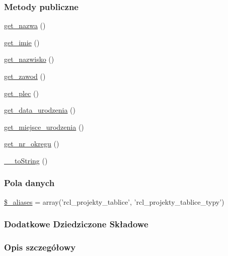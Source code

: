 \subsubsection*{Metody publiczne}
\begin{DoxyCompactItemize}
\item 
\hyperlink{classep___r_c_l___projekt___etap_ac0818f0049d7b84f08f77128f54cee36}{get\-\_\-nazwa} ()
\item 
\hyperlink{classep___r_c_l___projekt___etap_ac4b0c85dc2a130038f2d118dbd0c3d77}{get\-\_\-imie} ()
\item 
\hyperlink{classep___r_c_l___projekt___etap_abdd1d7ff92508da7f748ba1feec97af0}{get\-\_\-nazwisko} ()
\item 
\hyperlink{classep___r_c_l___projekt___etap_af80ca8310b60004454dd02a387deaa2c}{get\-\_\-zawod} ()
\item 
\hyperlink{classep___r_c_l___projekt___etap_ac7f9af5c3fa024e4c26a7b6bd4ce4bb4}{get\-\_\-plec} ()
\item 
\hyperlink{classep___r_c_l___projekt___etap_a880b240cd2d8c336fd1709bf0cb1ae2c}{get\-\_\-data\-\_\-urodzenia} ()
\item 
\hyperlink{classep___r_c_l___projekt___etap_ac57c08ec5e394a19c5bd9280c8376182}{get\-\_\-miejsce\-\_\-urodzenia} ()
\item 
\hyperlink{classep___r_c_l___projekt___etap_a2645a9f0aa5b0ccc482943348c033d0a}{get\-\_\-nr\-\_\-okregu} ()
\item 
\hyperlink{classep___r_c_l___projekt___etap_a7516ca30af0db3cdbf9a7739b48ce91d}{\-\_\-\-\_\-to\-String} ()
\end{DoxyCompactItemize}
\subsubsection*{Pola danych}
\begin{DoxyCompactItemize}
\item 
\hyperlink{classep___r_c_l___projekt___etap_ab4e31d75f0bc5d512456911e5d01366b}{\$\-\_\-aliases} = array('rcl\-\_\-projekty\-\_\-tablice', 'rcl\-\_\-projekty\-\_\-tablice\-\_\-typy')
\end{DoxyCompactItemize}
\subsubsection*{Dodatkowe Dziedziczone Składowe}


\subsubsection{Opis szczegółowy}


